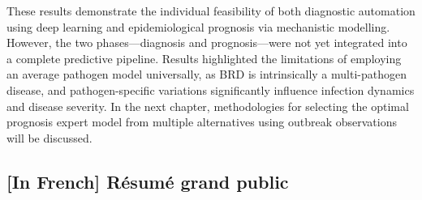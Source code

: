 \begin{enumerate}
\end{enumerate}

These results demonstrate the individual feasibility of both diagnostic automation using deep learning and epidemiological prognosis via mechanistic modelling. However, the two phases—diagnosis and prognosis—were not yet integrated into a complete predictive pipeline. Results highlighted the limitations of employing an average pathogen model universally, as BRD is intrinsically a multi-pathogen disease, and pathogen-specific variations significantly influence infection dynamics and disease severity. In the next chapter, methodologies for selecting the optimal prognosis expert model from multiple alternatives using outbreak observations will be discussed. 










\subsection{[In French] Résumé grand public}


